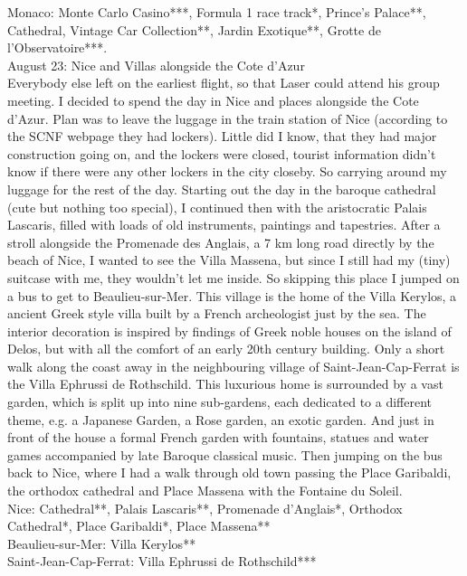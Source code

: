 Monaco: Monte Carlo Casino***, Formula 1 race track*, Prince's Palace**, Cathedral, Vintage Car Collection**, Jardin Exotique**, Grotte de l'Observatoire***.\\

August 23: Nice and Villas alongside the Cote d'Azur\\
Everybody else left on the earliest flight, so that Laser could attend his group meeting. I decided to spend the day in Nice and places alongside the Cote d'Azur. Plan was to leave the luggage in the train station of Nice (according to the SCNF webpage they had lockers). Little did I know, that they had major construction going on, and the lockers were closed, tourist information didn't know if there were any other lockers in the city closeby. So carrying around my luggage for the rest of the day. Starting out the day in the baroque cathedral (cute but nothing too special), I continued then with the aristocratic Palais Lascaris, filled with loads of old instruments, paintings and tapestries. After a stroll alongside the Promenade des Anglais, a 7 km long road directly by the beach of Nice, I wanted to see the Villa Massena, but since I still had my (tiny) suitcase with me, they wouldn't let me inside. So skipping this place I jumped on a bus to get to Beaulieu-sur-Mer. This village is the home of the Villa Kerylos, a ancient Greek style villa built by a French archeologist just by the sea. The interior decoration is inspired by findings of Greek noble houses on the island of Delos, but with all the comfort of an early 20th century building. Only a short walk along the coast away in the neighbouring village of Saint-Jean-Cap-Ferrat is the Villa Ephrussi de Rothschild. This luxurious home is surrounded by a vast garden, which is split up into nine sub-gardens, each dedicated to a different theme, e.g. a Japanese Garden, a Rose garden, an exotic garden. And just in front of the house a formal French garden with fountains, statues and water games accompanied by late Baroque classical music. Then jumping on the bus back to Nice, where I had a walk through old town passing the Place Garibaldi, the orthodox cathedral and Place Massena with the Fontaine du Soleil.\\

Nice: Cathedral**, Palais Lascaris**, Promenade d'Anglais*, Orthodox Cathedral*, Place Garibaldi*, Place Massena**\\
Beaulieu-sur-Mer: Villa Kerylos**\\
Saint-Jean-Cap-Ferrat: Villa Ephrussi de Rothschild***

